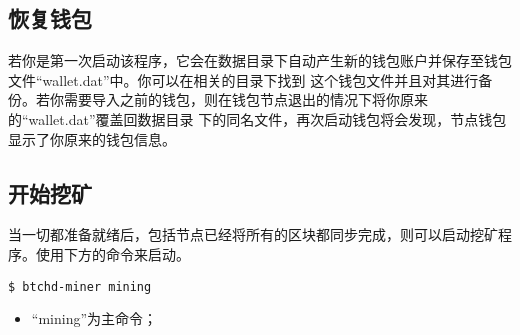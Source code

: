 \subsection{恢复钱包}
\begin{flushleft}
    若你是第一次启动该程序，它会在数据目录下自动产生新的钱包账户并保存至钱包文件``wallet.dat''中。你可以在相关的目录下找到
    这个钱包文件并且对其进行备份。若你需要导入之前的钱包，则在钱包节点退出的情况下将你原来的``wallet.dat''覆盖回数据目录
    下的同名文件，再次启动钱包将会发现，节点钱包显示了你原来的钱包信息。
\end{flushleft}
\subsection{开始挖矿}
\begin{flushleft}
    当一切都准备就绪后，包括节点已经将所有的区块都同步完成，则可以启动挖矿程序。使用下方的命令来启动。
\end{flushleft}
\scriptsize
\begin{verbatim}
$ btchd-miner mining
\end{verbatim}
\normalsize
\begin{itemize}
    \item ``mining''为主命令；
\end{itemize}
